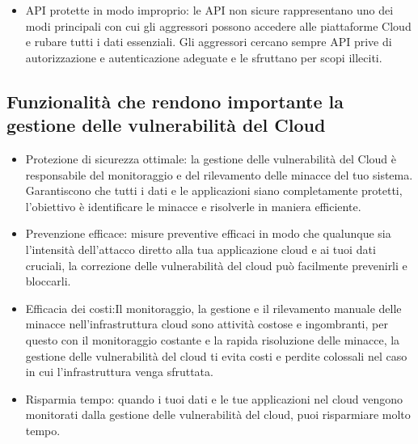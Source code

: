 \begin{itemize}
    \item API protette in modo improprio: le API non sicure rappresentano uno dei modi principali con cui gli aggressori possono accedere alle piattaforme Cloud e rubare tutti i dati essenziali.  Gli aggressori cercano sempre API prive di autorizzazione e autenticazione adeguate e le sfruttano per scopi illeciti. 
\end{itemize}
\subsection{Funzionalità che rendono importante la gestione delle vulnerabilità del Cloud}
\begin{itemize}
    \item Protezione di sicurezza ottimale: la gestione delle vulnerabilità del Cloud è responsabile del monitoraggio e del rilevamento delle minacce del tuo sistema. Garantiscono che tutti i dati e le applicazioni siano completamente protetti, l’obiettivo è identificare le minacce e risolverle in maniera efficiente.
    \item Prevenzione efficace: misure preventive efficaci in modo che qualunque sia l'intensità dell'attacco diretto alla tua applicazione cloud e ai tuoi dati cruciali, la correzione delle vulnerabilità del cloud può facilmente prevenirli e bloccarli.
    \item Efficacia dei costi:Il monitoraggio, la gestione e il rilevamento manuale delle minacce nell'infrastruttura cloud sono attività costose e ingombranti, per questo con il monitoraggio costante e la rapida risoluzione delle minacce, la gestione delle vulnerabilità del cloud ti evita costi e perdite colossali nel caso in cui l'infrastruttura venga sfruttata.
    \item Risparmia tempo: quando i tuoi dati e le tue applicazioni nel cloud vengono monitorati dalla gestione delle vulnerabilità del cloud, puoi risparmiare molto tempo. 
\end{itemize}

